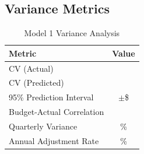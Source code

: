 \subsection{Variance Metrics}

\begin{table}[h]
\centering
\caption{Model 1 Variance Analysis}
\begin{tabular}{lc}
\toprule
\textbf{Metric} & \textbf{Value} \\
\midrule
CV (Actual) & \ModelOneCVActual{} \\
CV (Predicted) & \ModelOneCVPredicted{} \\
95\% Prediction Interval & $\pm$\$\ModelOnePredictionInterval{} \\
Budget-Actual Correlation & \ModelOneBudgetActualCorr{} \\
Quarterly Variance & \ModelOneQuarterlyVariance{}\% \\
Annual Adjustment Rate & \ModelOneAnnualAdjustmentRate{}\% \\
\bottomrule
\end{tabular}
\end{table}